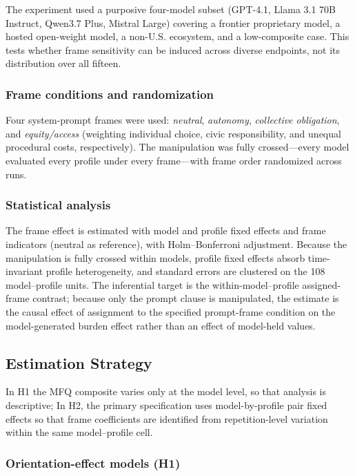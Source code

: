 \documentclass[12pt,a4paper]{article}
\begin{document}
The experiment used a purposive four-model subset (GPT-4.1, Llama 3.1 70B Instruct, Qwen3.7 Plus, Mistral Large) covering a frontier proprietary model, a hosted open-weight model, a non-U.S. ecosystem, and a low-composite case. This tests whether frame sensitivity can be induced across diverse endpoints, not its distribution over all fifteen.

\subsubsection{Frame conditions and randomization}

Four system-prompt frames were used: \emph{neutral}, \emph{autonomy}, \emph{collective obligation}, and \emph{equity/access} (weighting individual choice, civic responsibility, and unequal procedural costs, respectively). The manipulation was fully crossed---every model evaluated every profile under every frame---with frame order randomized across runs.

\subsubsection{Statistical analysis}

The frame effect is estimated with model and profile fixed effects and frame indicators (neutral as reference), with Holm--Bonferroni adjustment. Because the manipulation is fully crossed within models, profile fixed effects absorb time-invariant profile heterogeneity, and standard errors are clustered on the 108 model--profile units. The inferential target is the within-model--profile assigned-frame contrast; because only the prompt clause is manipulated, the estimate is the causal effect of assignment to the specified prompt-frame condition on the model-generated burden effect rather than an effect of model-held values.
\subsection{Estimation Strategy}
\label{sec:estimation}

In H1 the MFQ composite varies only at the model level, so that analysis is descriptive; In H2, the primary specification uses model-by-profile pair fixed effects so that frame coefficients are identified from repetition-level variation within the same model--profile cell.

\subsubsection{Orientation-effect models (H1)}
\label{sec:est-h1}
\end{document}
